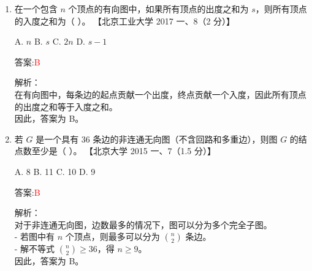\documentclass[lang=cn,newtx,10pt,scheme=chinese]{../../../elegantbook}
\begin{document}
\begin{enumerate}
\item 在一个包含 $n$ 个顶点的有向图中，如果所有顶点的出度之和为 $s$，则所有顶点的入度之和为（ ）。  
    【北京工业大学 2017 一、8（2 分）】  

    A. $n$ \quad B. $s$ \quad C. $2n$ \quad D. $s-1$  

    答案:\textcolor{red}{B}

    解析：\\
    在有向图中，每条边的起点贡献一个出度，终点贡献一个入度，因此所有顶点的出度之和等于入度之和。\\
    因此，答案为 B。

\item 若 $G$ 是一个具有 36 条边的非连通无向图（不含回路和多重边），则图 $G$ 的结点数至少是（ ）。  
    【北京大学 2015 一、7（1.5 分）】 

    A. 8 \quad B. 11 \quad C. 10 \quad D. 9  

    答案:\textcolor{red}{B}

    解析：\\
    对于非连通无向图，边数最多的情况下，图可以分为多个完全子图。\\
    - 若图中有 $n$ 个顶点，则最多可以分为 $\binom{n}{2}$ 条边。\\
    - 解不等式 $\binom{n}{2} \geq 36$，得 $n \geq 9$。\\
    因此，答案为 B。
\end{enumerate}
\end{document}
